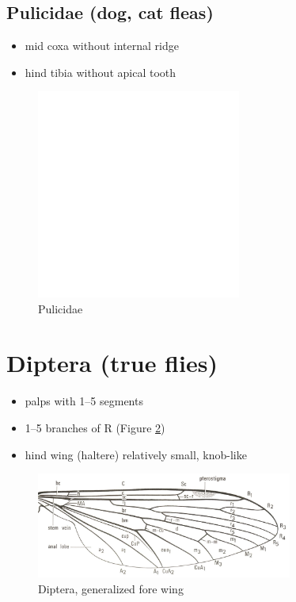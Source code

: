 \documentclass[letterpaper, 11pt]{article}
\begin{document}
\subsection{Pulicidae (dog, cat fleas)}
\begin{itemize}
\item mid coxa without internal ridge
\item hind tibia without apical tooth
\end{itemize}

\begin{figure}[ht!]
  \centering
    \includegraphics[width=0.6\textwidth]{blank}
  \caption{Pulicidae}
  \label{fig:pulicid}
\end{figure}

\section{Diptera (true flies)}
\begin{itemize}
\item palps with 1--5 segments
\item 1--5 branches of R (Figure \ref{fig:dipteranwing})
\item hind wing (haltere) relatively small, knob-like
\end{itemize}

\begin{figure}[ht!]
  \centering
    \includegraphics[width=0.75\textwidth]{DipteraWing}
  \caption{Diptera, generalized fore wing \citep[][Fig. 67]{mcalpine1981manual}}
  \label{fig:dipteranwing}
\end{figure}
\end{document}
